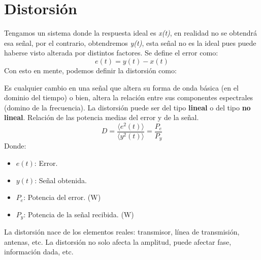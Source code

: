 \documentclass[
	12pt, %
	fleqn, %
	a4paper, %
	oneside, %
]{LegrandOrangeBook}
\begin{document}
\section{Distorsión}
Tengamos un sistema donde la respuesta ideal es \textit{x(t)}, en realidad no se obtendrá esa señal, por el contrario, obtendremos \textit{y(t)}, esta señal no es la ideal pues puede haberse visto alterada por distintos factores. Se define el error como:
\begin{equation}
e(t)=y(t)-x(t)
\end{equation}
Con esto en mente, podemos definir la distorsión como:
\begin{definition}[Distorsión]
Es cualquier cambio en una señal que altera su forma de onda básica (en el dominio del tiempo) o bien, altera la relación entre sus componentes espectrales (domino de la frecuencia). La distorsión puede ser del tipo \textbf{lineal} o del tipo \textbf{no lineal}. Relación de las potencia medias del error y de la señal.
\begin{equation}
D=\frac{\langle e^2(t)\rangle}{\langle y^2(t)\rangle}=\frac{P_e}{P_y}
\end{equation}
Donde:
\begin{itemize}
\item $e(t)$: Error.
\item $y(t)$: Señal obtenida.
\item $P_e$: Potencia del error. (W)
\item $P_y$: Potencia de la señal recibida. (W)
\end{itemize}
\end{definition}
La distorsión nace de los elementos reales: transmisor, línea de transmisión, antenas, etc. La distorsión no solo afecta la amplitud, puede afectar fase, información dada, etc.
\end{document}
